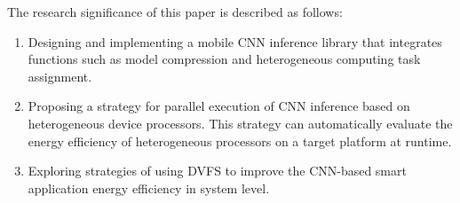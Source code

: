 \begin{enabstract}
The research significance of this paper is described as follows:

\begin{enumerate}
  \item Designing and implementing a mobile CNN inference library that integrates functions such as model compression and heterogeneous computing task assignment.
  \item Proposing a strategy for parallel execution of CNN inference based on heterogeneous device processors. This strategy can automatically evaluate the energy efficiency of heterogeneous processors on a target platform at runtime.
  \item Exploring strategies of using DVFS to improve the CNN-based smart application energy efficiency in system level.
\end{enumerate}

\end{enabstract} 
